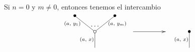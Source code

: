 \documentclass[../main.tex]{subfiles}
\begin{document}
Si $n=0$ y $m\ne 0$, entonces tenemos el intercambio
\begin{equation}
    \xy
    <0.08cm, 0cm>:
    (0.0, 0.0)*{}="1"; %
    (0.0, 10.0)*\cir<2pt>{}="2"; %
    (-12.5, 20.0)*=0{\bullet}="3"; %
    (12.5, 20.0)*=0{\bullet}="4"; %
    "1";"2" **\dir{-};
    "2";"3" **\dir{-};
    "2";"4" **\dir{-};
    (-5.0, 5.0)*=0{\scriptstyle (a,\text{ }x)};
    (-14, 15.0)*=0{\scriptstyle (a,\text{ }y_1)};
    (14, 15.0)*=0{\scriptstyle (a,\text{ }y_m)};
    (0,13.5)*{\dots};
    \endxy
    \xy
    <0.08cm, 0cm>:
    (-20, 0.0)*{}="1";
    (20, 10.0)*{}="2";
    {\ar(-10, 10)*{};(10,10)*{}};
    \endxy
    \xy
    <0.08cm, 0cm>:
    (0.0, 0.0)*{}="1"; %
    (0.0, 10.0)*=0{\bullet}="2"; %
    "1";"2" **\dir{-};
    (-5.0, 5.0)*=0{\scriptstyle (a,\text{ }x)};
    \endxy
\end{equation}
\end{document}
